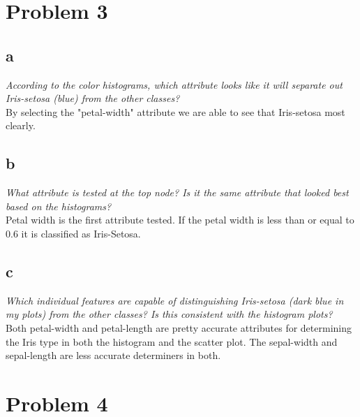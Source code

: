 \documentclass{article}
\begin{document}
\section*{Problem 3}
\subsection*{a}
\textit{According to the color histograms, which attribute looks like it will separate out
Iris-setosa (blue) from the other classes?}\\
By selecting the "petal-width" attribute we are able to see that Iris-setosa most clearly.\\
\subsection*{b}
\textit{What attribute is tested at the top node? Is it the same attribute that looked best
based on the histograms?}\\
Petal width is the first attribute tested. If the petal width is less than or equal to $0.6$ it is classified as Iris-Setosa.\\
\subsection*{c}
\textit{Which individual
features are capable of distinguishing Iris-setosa (dark blue in my plots) from the other
classes? Is this consistent with the histogram plots?}\\
Both petal-width and petal-length are pretty accurate attributes for determining the Iris type in both the histogram and the scatter plot. The sepal-width and sepal-length are less accurate determiners in both.\\

\section*{Problem 4}
\end{document}
